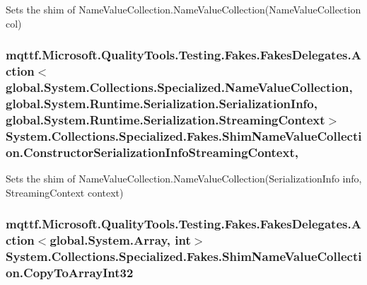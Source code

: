 Sets the shim of Name\-Value\-Collection.\-Name\-Value\-Collection(\-Name\-Value\-Collection col)

\hypertarget{class_system_1_1_collections_1_1_specialized_1_1_fakes_1_1_shim_name_value_collection_a82ac246f897ae6d139cac54436b4c8be}{
\subsubsection[{Constructor\-Serialization\-Info\-Streaming\-Context}]{\setlength{\rightskip}{0pt plus 5cm}mqttf.\-Microsoft.\-Quality\-Tools.\-Testing.\-Fakes.\-Fakes\-Delegates.\-Action$<$global.\-System.\-Collections.\-Specialized.\-Name\-Value\-Collection, global.\-System.\-Runtime.\-Serialization.\-Serialization\-Info, global.\-System.\-Runtime.\-Serialization.\-Streaming\-Context$>$ System.\-Collections.\-Specialized.\-Fakes.\-Shim\-Name\-Value\-Collection.\-Constructor\-Serialization\-Info\-Streaming\-Context\hspace{0.3cm}{\ttfamily [static]}, {\ttfamily [set]}}}\label{class_system_1_1_collections_1_1_specialized_1_1_fakes_1_1_shim_name_value_collection_a82ac246f897ae6d139cac54436b4c8be}


Sets the shim of Name\-Value\-Collection.\-Name\-Value\-Collection(\-Serialization\-Info info, Streaming\-Context context)

\hypertarget{class_system_1_1_collections_1_1_specialized_1_1_fakes_1_1_shim_name_value_collection_ac58f150113b3a2efcc42da85be269bd9}{
\subsubsection[{Copy\-To\-Array\-Int32}]{\setlength{\rightskip}{0pt plus 5cm}mqttf.\-Microsoft.\-Quality\-Tools.\-Testing.\-Fakes.\-Fakes\-Delegates.\-Action$<$global.\-System.\-Array, int$>$ System.\-Collections.\-Specialized.\-Fakes.\-Shim\-Name\-Value\-Collection.\-Copy\-To\-Array\-Int32\hspace{0.3cm}{\ttfamily [set]}}}\label{class_system_1_1_collections_1_1_specialized_1_1_fakes_1_1_shim_name_value_collection_ac58f150113b3a2efcc42da85be269bd9}


